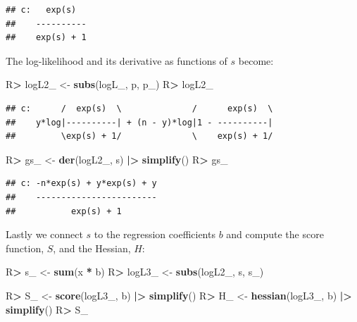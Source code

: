 \documentclass[10pt,]{article}
\newenvironment{Shaded}{\begin{snugshade}}{\end{snugshade}}
\newcommand{\ErrorTok}[1]{\textcolor[rgb]{0.64,0.00,0.00}{\textbf{#1}}}
\newcommand{\KeywordTok}[1]{\textcolor[rgb]{0.13,0.29,0.53}{\textbf{#1}}}
\newcommand{\NormalTok}[1]{#1}
\newcommand{\OperatorTok}[1]{\textcolor[rgb]{0.81,0.36,0.00}{\textbf{#1}}}
\newcommand{\StringTok}[1]{\textcolor[rgb]{0.31,0.60,0.02}{#1}}
\begin{document}
\begin{verbatim}
## c:   exp(s)  
##    ----------
##    exp(s) + 1
\end{verbatim}

The log-likelihood and its derivative as functions of \(s\) become:

\begin{Shaded}
\begin{Highlighting}[]
\NormalTok{R}\OperatorTok{>}\StringTok{ }\NormalTok{logL2_ <-}\StringTok{ }\KeywordTok{subs}\NormalTok{(logL_, p, p_)}
\NormalTok{R}\OperatorTok{>}\StringTok{ }\NormalTok{logL2_}
\end{Highlighting}
\end{Shaded}

\begin{verbatim}
## c:      /  exp(s)  \              /      exp(s)  \
##    y*log|----------| + (n - y)*log|1 - ----------|
##         \exp(s) + 1/              \    exp(s) + 1/
\end{verbatim}

\begin{Shaded}
\begin{Highlighting}[]
\NormalTok{R}\OperatorTok{>}\StringTok{ }\NormalTok{gs_ <-}\StringTok{ }\KeywordTok{der}\NormalTok{(logL2_, s) }\OperatorTok{|}\ErrorTok{>}\StringTok{ }\KeywordTok{simplify}\NormalTok{()}
\NormalTok{R}\OperatorTok{>}\StringTok{ }\NormalTok{gs_}
\end{Highlighting}
\end{Shaded}

\begin{verbatim}
## c: -n*exp(s) + y*exp(s) + y
##    ------------------------
##           exp(s) + 1
\end{verbatim}

Lastly we connect \(s\) to the regression coefficients \(b\) and compute
the score function, \(S\), and the Hessian, \(H\):

\begin{Shaded}
\begin{Highlighting}[]
\NormalTok{R}\OperatorTok{>}\StringTok{ }\NormalTok{s_ <-}\StringTok{ }\KeywordTok{sum}\NormalTok{(x }\OperatorTok{*}\StringTok{ }\NormalTok{b)}
\NormalTok{R}\OperatorTok{>}\StringTok{ }\NormalTok{logL3_ <-}\StringTok{ }\KeywordTok{subs}\NormalTok{(logL2_, s, s_)}
\end{Highlighting}
\end{Shaded}

\begin{Shaded}
\begin{Highlighting}[]
\NormalTok{R}\OperatorTok{>}\StringTok{ }\NormalTok{S_ <-}\StringTok{ }\KeywordTok{score}\NormalTok{(logL3_, b) }\OperatorTok{|}\ErrorTok{>}\StringTok{ }\KeywordTok{simplify}\NormalTok{()}
\NormalTok{R}\OperatorTok{>}\StringTok{ }\NormalTok{H_ <-}\StringTok{ }\KeywordTok{hessian}\NormalTok{(logL3_, b) }\OperatorTok{|}\ErrorTok{>}\StringTok{ }\KeywordTok{simplify}\NormalTok{()}
\NormalTok{R}\OperatorTok{>}\StringTok{ }\NormalTok{S_}
\end{Highlighting}
\end{Shaded}
\end{document}
